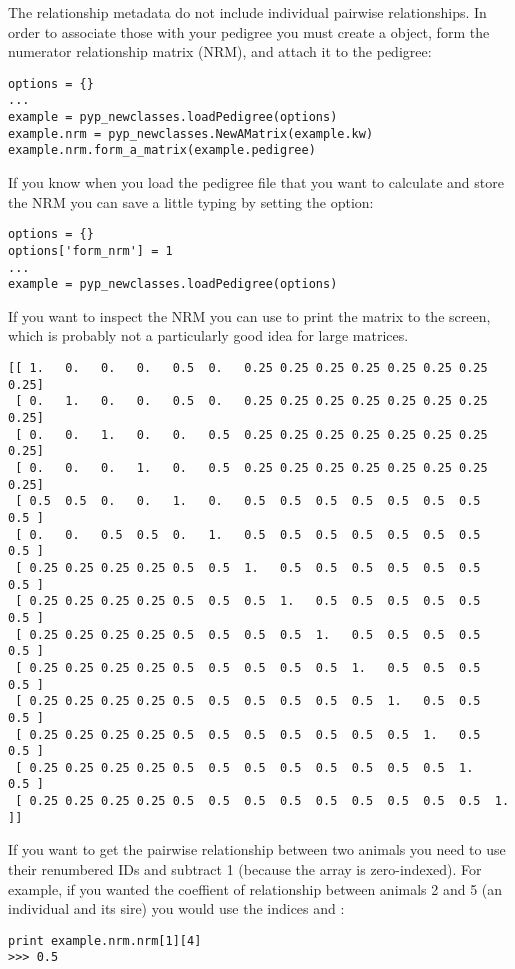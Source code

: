 The relationship metadata do not include individual pairwise relationships. In order to associate those with your pedigree you must create a  object, form the numerator relationship matrix (NRM), and attach it to the pedigree:
\begin{verbatim}
options = {}
...
example = pyp_newclasses.loadPedigree(options)
example.nrm = pyp_newclasses.NewAMatrix(example.kw)
example.nrm.form_a_matrix(example.pedigree)
\end{verbatim}
If you know when you load the pedigree file  that you want to calculate and store the NRM you can save a little typing by setting the  option:
\begin{verbatim}
options = {}
options['form_nrm'] = 1
...
example = pyp_newclasses.loadPedigree(options)
\end{verbatim}
If you want to inspect the NRM you can use  to print the matrix to the screen, which is probably not a particularly good idea for large matrices.
\begin{verbatim}
[[ 1.   0.   0.   0.   0.5  0.   0.25 0.25 0.25 0.25 0.25 0.25 0.25 0.25]
 [ 0.   1.   0.   0.   0.5  0.   0.25 0.25 0.25 0.25 0.25 0.25 0.25 0.25]
 [ 0.   0.   1.   0.   0.   0.5  0.25 0.25 0.25 0.25 0.25 0.25 0.25 0.25]
 [ 0.   0.   0.   1.   0.   0.5  0.25 0.25 0.25 0.25 0.25 0.25 0.25 0.25]
 [ 0.5  0.5  0.   0.   1.   0.   0.5  0.5  0.5  0.5  0.5  0.5  0.5  0.5 ]
 [ 0.   0.   0.5  0.5  0.   1.   0.5  0.5  0.5  0.5  0.5  0.5  0.5  0.5 ]
 [ 0.25 0.25 0.25 0.25 0.5  0.5  1.   0.5  0.5  0.5  0.5  0.5  0.5  0.5 ]
 [ 0.25 0.25 0.25 0.25 0.5  0.5  0.5  1.   0.5  0.5  0.5  0.5  0.5  0.5 ]
 [ 0.25 0.25 0.25 0.25 0.5  0.5  0.5  0.5  1.   0.5  0.5  0.5  0.5  0.5 ]
 [ 0.25 0.25 0.25 0.25 0.5  0.5  0.5  0.5  0.5  1.   0.5  0.5  0.5  0.5 ]
 [ 0.25 0.25 0.25 0.25 0.5  0.5  0.5  0.5  0.5  0.5  1.   0.5  0.5  0.5 ]
 [ 0.25 0.25 0.25 0.25 0.5  0.5  0.5  0.5  0.5  0.5  0.5  1.   0.5  0.5 ]
 [ 0.25 0.25 0.25 0.25 0.5  0.5  0.5  0.5  0.5  0.5  0.5  0.5  1.   0.5 ]
 [ 0.25 0.25 0.25 0.25 0.5  0.5  0.5  0.5  0.5  0.5  0.5  0.5  0.5  1.  ]]
\end{verbatim}
If you want to get the pairwise relationship between two animals you need to use their renumbered IDs and subtract 1 (because the array is zero-indexed). For example, if you wanted the coeffient of relationship between animals 2 and 5 (an individual and its sire) you would use the indices  and :
\begin{verbatim}
print example.nrm.nrm[1][4]
>>> 0.5
\end{verbatim}
